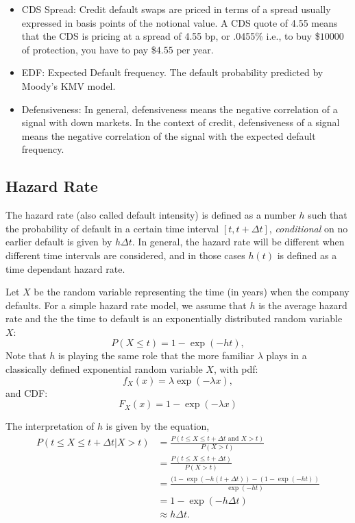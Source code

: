 \documentclass{amsart}
\theoremstyle{plain}
\numberwithin{equation}{section}
\begin{document}
\begin{itemize}
\item CDS Spread: Credit default swaps are priced in terms of a spread usually expressed in basis points of the notional value. A CDS quote of 4.55 means that the CDS is pricing at a spread of 4.55 bp, or .0455\% i.e., to buy \$$10000$ of protection, you have to pay \$$4.55$ per year.

\item EDF: Expected Default frequency. The default probability predicted by Moody's KMV model.

\item Defensiveness: In general, defensiveness means the negative correlation of a signal with 
down markets. In the context of credit, defensiveness of a signal means the negative correlation of the signal with the expected default frequency.

\end{itemize}
\subsection{Hazard Rate}
The hazard rate (also called default intensity) is defined 
as a number $h$ such that the probability of default in a certain time interval $[t, t+\Delta t]$, \emph{conditional} on no earlier default is given by $h\Delta t$. In general, the hazard rate will be different when different time intervals
are considered, and in those cases $h(t)$ is defined
as a time dependant hazard rate.

Let $X$ be the random variable representing the time (in years)
when the company defaults. For a simple hazard rate model, 
we assume that $h$ is the average hazard rate and the 
the time to default is an exponentially distributed 
random variable $X$:
$$P( X \leq t ) = 1 - \exp( -h t ),$$
Note that $h$ is playing the same role that 
the more familiar $\lambda$ plays in a classically
defined exponential random variable $X$, with pdf:
$$f_X(x) = \lambda \exp(-\lambda x),$$
and CDF:
$$F_X(x) = 1-\exp(-\lambda x)$$

The interpretation of $h$ is given by the equation,
\begin{align*}
P( t \leq X \leq t + \Delta t | X > t ) &=\frac{P( t \leq X \leq t + \Delta t \mbox{ and } X > t )}{P(X >t)}\\
&= \frac{P( t \leq X \leq t + \Delta t)}{P(X >t)}\\
&= \frac{(1-\exp(-h(t+\Delta t))-(1-\exp(-ht))}{\exp(-ht)}\\
&= 1 - \exp(-h\Delta t)\\
& \approx h \Delta t.
\end{align*}
\end{document}
